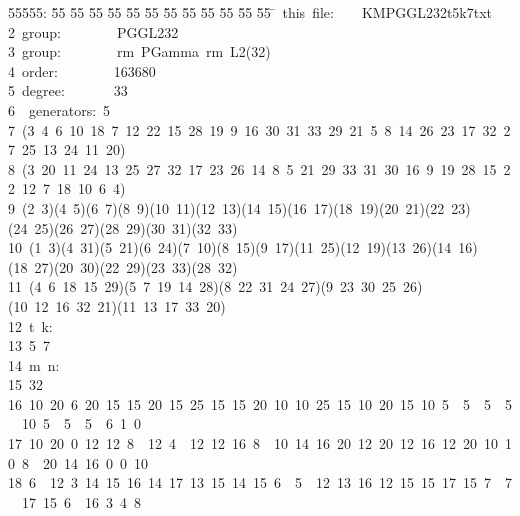 %
%
\begin{tabbing}
55555: \= 55 \= 55 \= 55 \= 55 \= 55 \= 55 \= 55 \= 55 \= 55 \= 55 \= 55 \= 55 \= \>\ this\ file:\ \ \ \ KMPGGL232t5k7txt\\[-7pt]
2\>\ group:\ \ \ \ \ \ \ \ PGGL232\ \\[-7pt]
3\>\ group:\ \ \ \ \ \ \ \ rm\ PGamma\ rm\ L2(32)\ \\[-7pt]
4\>\ order:\ \ \ \ \ \ \ \ 163680\ \\[-7pt]
5\>\ degree:\ \ \ \ \ \ \ 33\ \\[-7pt]
6\>\ \ generators:\ 5\ \\[-7pt]
7\>\ (3\ 4\ 6\ 10\ 18\ 7\ 12\ 22\ 15\ 28\ 19\ 9\ 16\ 30\ 31\ 33\ 29\ 21\ 5\ 8\ 14\ 26\ 23\ 17\ 32\ 27\ 25\ 13\ 24\ 11\ 20)\\[-7pt]
8\>\ (3\ 20\ 11\ 24\ 13\ 25\ 27\ 32\ 17\ 23\ 26\ 14\ 8\ 5\ 21\ 29\ 33\ 31\ 30\ 16\ 9\ 19\ 28\ 15\ 22\ 12\ 7\ 18\ 10\ 6\ 4)\\[-7pt]
9\>\ (2\ 3)(4\ 5)(6\ 7)(8\ 9)(10\ 11)(12\ 13)(14\ 15)(16\ 17)(18\ 19)(20\ 21)(22\ 23)(24\ 25)(26\ 27)(28\ 29)(30\ 31)(32\ 33)\\[-7pt]
10\>\ (1\ 3)(4\ 31)(5\ 21)(6\ 24)(7\ 10)(8\ 15)(9\ 17)(11\ 25)(12\ 19)(13\ 26)(14\ 16)(18\ 27)(20\ 30)(22\ 29)(23\ 33)(28\ 32)\\[-7pt]
11\>\ (4\ 6\ 18\ 15\ 29)(5\ 7\ 19\ 14\ 28)(8\ 22\ 31\ 24\ 27)(9\ 23\ 30\ 25\ 26)(10\ 12\ 16\ 32\ 21)(11\ 13\ 17\ 33\ 20)\\[-7pt]
12\>\ t\ k:\\[-7pt]
13\>\ 5\ 7\\[-7pt]
14\>\ m\ n:\\[-7pt]
15\ 32\\[-7pt]
16\ 10\ 20\ 6\ 20\ 15\ 15\ 20\ 15\ 25\ 15\ 15\ 20\ 10\ 10\ 25\ 15\ 10\ 20\ 15\ 10\ 5\ \ 5\ \ 5\ \ 5\ \ 10\ 5\ \ 5\ \ 5\ \ 6\ 1\ 0\ \ \\[-7pt]
17\ 10\ 20\ 0\ 12\ 12\ 8\ \ 12\ 4\ \ 12\ 12\ 16\ 8\ \ 10\ 14\ 16\ 20\ 12\ 20\ 12\ 16\ 12\ 20\ 10\ 10\ 8\ \ 20\ 14\ 16\ 0\ 0\ 10\ \\[-7pt]
18\ 6\ \ 12\ 3\ 14\ 15\ 16\ 14\ 17\ 13\ 15\ 14\ 15\ 6\ \ 5\ \ 12\ 13\ 16\ 12\ 15\ 15\ 17\ 15\ 7\ \ 7\ \ 17\ 15\ 6\ \ 16\ 3\ 4\ 8\ \ \\[-7pt]

\end{tabbing}
